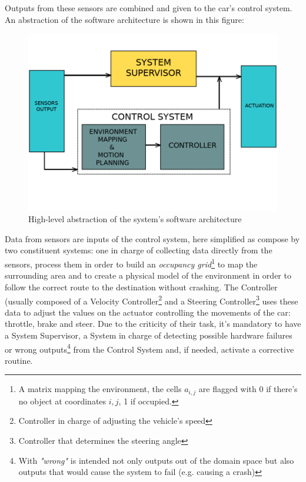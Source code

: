Outputs from these sensors are combined and given to the car's control system.
An abstraction of the software architecture is shown in this figure:
\begin{figure}[h!]
	\includegraphics[width=\textwidth]{img/av-architecture.png}
	\caption{High-level abstraction of the system's software architecture}
\end{figure}

Data from sensors are inputs of the control system, here simplified as compose by two constituent systems: one in charge of collecting data directly from the sensors, process them in order to build an \textsl{occupancy grid}\footnote{A matrix mapping the environment, the cells $a_{i,j}$ are flagged with 0 if there's no object at coordinates $i,j$, 1 if occupied.} to map the surrounding area and to create a physical model of the environment in order to follow the correct route to the destination without crashing. The Controller (usually composed of a Velocity Controller\footnote{Controller in charge of adjusting the vehicle's speed} and a Steering Controller\footnote{Controller that determines the steering angle} uses these data to adjust the values on the actuator controlling the movements of the car: throttle, brake and steer.\newline
Due to the criticity of their task, it's mandatory to have a System Supervisor, a System in charge of detecting possible hardware failures or wrong outputs\footnote{With \textsl{"wrong"} is intended not only outputs out of the domain space but also outputs that would cause the system to fail (e.g. causing a crash)} from the Control System and, if needed, activate a corrective routine.

